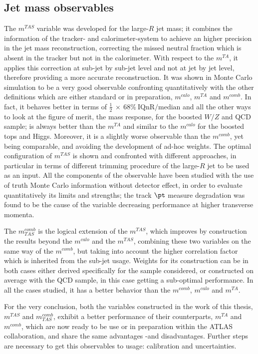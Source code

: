 \documentclass[UKenglish,texlive=2013]{\ATLASLATEXPATH atlasdoc}
\newcommand{\mta}{m^{TA}}
\newcommand{\mtas}{m^{TAS}}
\newcommand{\mcal}{m^{calo}}
\newcommand{\mcomb}{m^{comb}}
\newcommand{\mcombtas}{m^{comb}_{TAS}}
\newcommand{\iqr}{\frac{1}{2}\: \times\: 68\% \:\textrm{IQnR/median}}
\begin{document}
\subsection{Jet mass observables}
The $\mtas$ variable was developed for the large-$R$ jet mass; it combines the information of the tracker- and calorimeter-system to achieve an higher precision in the jet mass reconstruction, correcting the missed neutral fraction which is absent in the tracker but not in the calorimeter.
With respect to the $\mta$, it applies this correction at sub-jet by sub-jet level and not at jet by jet level, therefore providing a more accurate reconstruction. 
It was shown in Monte Carlo simulation to be a very good observable confronting quantitatively with the other definitions which are either standard or in preparation, $\mcal$, $\mta$ and $\mcomb$.
In fact, it behaves better in terms of $\iqr$ and all the other ways to look at the figure of merit, the mass response, for the boosted $W/Z$ and QCD sample; is always better than the $\mta$ and similar to the $\mcal$ for the boosted tops and Higgs.
Moreover, it is a slightly worse observable than the $\mcomb$, yet being comparable, and avoiding the development of ad-hoc weights.
The optimal configuration of $\mtas$ is shown and confronted with different approaches, in particular in terms of different trimming procedure of the large-$R$ jet to be used as an input.
All the components of the observable have been studied with the use of truth Monte Carlo information without detector effect, in order to evaluate quantitatively its limits and strengths; the track $\pt$ measure degradation was found to be the cause of the variable decreasing performance at higher transverse momenta.

The $\mcombtas$ is the logical extension of the $\mtas$, which improves by construction the results beyond the $\mcal$ and the $\mtas$, combining these two variables on the same way of the $\mcomb$, but taking into account the higher correlation factor which is inherited from the sub-jet usage.
Weights for its construction can be in both cases either derived specifically for the sample considered, or constructed on average with the QCD sample, in this case getting a sub-optimal performance. 
In all the cases studied, it has a better behavior than the $\mcomb$, $\mcal$ and $\mta$.

For the very conclusion, both the variables constructed in the work of this thesis,$\mtas$ and $\mcombtas$, exhibit a better performance of their counterparts, $\mta$ and $\mcomb$, which are now ready to be use or in preparation within the ATLAS collaboration, and share the same advantages -and disadvantages. Further steps are necessary to get this observables to usage: calibration and uncertainties.
\end{document}
